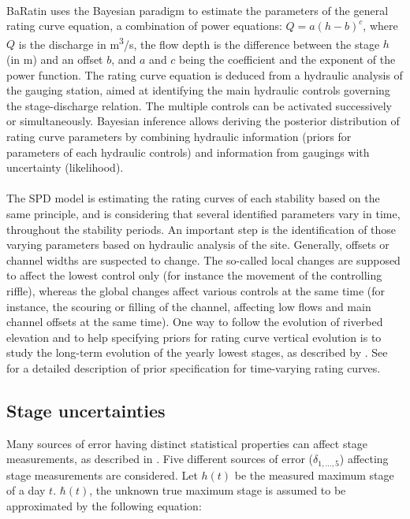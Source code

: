 \documentclass[11pt]{article}
\begin{document}
    \paragraph{} BaRatin uses the Bayesian paradigm to estimate the parameters of the general rating curve equation, a combination of power equations: $Q = a(h-b)^c$, where $Q$ is the discharge in m\textsuperscript{3}/s, the flow depth is the difference between the stage $h$ (in m) and an offset $b$, and $a$ and $c$ being the coefficient and the exponent of the power function. The rating curve equation is deduced from a hydraulic analysis of the gauging station, aimed at identifying the main hydraulic controls governing the stage-discharge relation. The multiple controls can be activated successively or simultaneously. Bayesian inference allows deriving the posterior distribution of rating curve parameters by combining hydraulic information (priors for parameters of each hydraulic controls) and information from gaugings with uncertainty (likelihood).
    \paragraph{}
    The SPD model is estimating the rating curves of each stability based on the same principle, and is considering that several identified parameters vary in time, throughout the stability periods. An important step is the identification of those varying parameters based on hydraulic analysis of the site. Generally, offsets or channel widths are suspected to change. The so-called local changes are supposed to affect the lowest control only (for instance the movement of the controlling riffle), whereas the global changes affect various controls at the same time (for instance, the scouring or filling of the channel, affecting low flows and main channel offsets at the same time). One way to follow the evolution of riverbed elevation and to help specifying priors for rating curve vertical evolution is to study the long-term evolution of the yearly lowest stages, as described by \citet{lapuszek_methods_2015}. See \citet{mansanarez_shift_2019} for a detailed description of prior specification for time-varying rating curves. 
    
    \subsection{Stage uncertainties}
    \label{sec:StageErr}
    
    Many sources of error having distinct statistical properties can affect stage measurements, as described in \citet{horner_impact_2018}. Five different sources of error ($\delta_{1,...,5}$) affecting stage measurements are considered. Let $h(t)$ be the measured maximum stage of a day $t$. $\hbar(t)$, the unknown true maximum stage is assumed to be approximated by the following equation:
    
\end{document}
